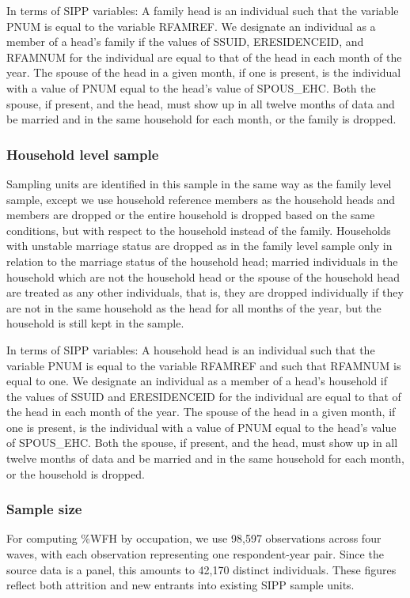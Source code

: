 \documentclass{article}
\begin{document}
In terms of SIPP variables: A family head is an individual such that the variable PNUM is equal to the variable RFAMREF. We designate an individual as a member of a head's family if the values of SSUID, ERESIDENCEID, and RFAMNUM for the individual are equal to that of the head in each month of the year. The spouse of the head in a given month, if one is present, is the individual with a value of PNUM equal to the head's value of SPOUS\_EHC. Both the spouse, if present, and the head, must show up in all twelve months of data and be married and in the same household for each month, or the family is dropped.

\subsubsection{Household level sample}
Sampling units are identified in this sample in the same way as the family level sample, except we use household reference members as the household heads and members are dropped or the entire household is dropped based on the same conditions, but with respect to the household instead of the family. Households with unstable marriage status are dropped as in the family level sample only in relation to the marriage status of the household head; married individuals in the household which are not the household head or the spouse of the household head are treated as any other individuals, that is, they are dropped individually if they are not in the same household as the head for all months of the year, but the household is still kept in the sample.

In terms of SIPP variables: A household head is an individual such that the variable PNUM is equal to the variable RFAMREF and such that RFAMNUM is equal to one. We designate an individual as a member of a head's household if the values of SSUID and ERESIDENCEID for the individual are equal to that of the head in each month of the year. The spouse of the head in a given month, if one is present, is the individual with a value of PNUM equal to the head's value of SPOUS\_EHC. Both the spouse, if present, and the head, must show up in all twelve months of data and be married and in the same household for each month, or the household is dropped.

\subsubsection{Sample size}
For computing \%WFH by occupation, we use 98,597 observations across four waves, with each observation representing one respondent-year pair. Since the source data is a panel, this amounts to 42,170 distinct individuals. These figures reflect both attrition and new entrants into existing SIPP sample units. 
\end{document}
